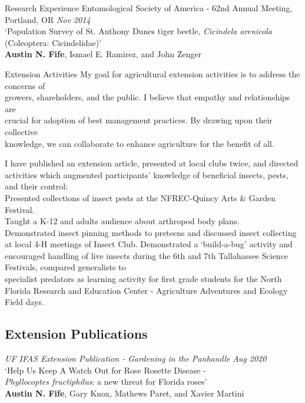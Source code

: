 \documentclass{resume} %
\begin{document}
\begin{rSection}{Research Experience}
Entomological Society of America - 62nd Annual Meeting, Portland, OR \hfill {\em \textit{Nov 2014}}\\
`Population Survey of St. Anthony Dunes tiger beetle, \textit{Cicindela arenicola} (Coleoptera: Cicindelidae)'\\
\textbf{Austin N. Fife}, Ismael E. Ramirez, and John Zenger\\ \hfill

\end{rSection}

\newpage


\begin{rSection}{Extension Activities}
	My goal for agricultural extension activities is to address the concerns of\\
	growers, shareholders, and the public. I believe that empathy and relationships are\\
	crucial	for adoption of best management practices. By drawing upon their collective\\
	knowledge, we can collaborate to enhance agriculture for the benefit of all. 
	
	I have published an extension article, presented at local clubs twice, and directed	activities which augmented participants' knowledge of beneficial insects, pests, and their control:\\
	Presented collections of insect pests at the NFREC-Quincy Arts \& Garden Festival.\\
	Taught a K-12 and adults audience about arthropod body plans.\\
	Demonstrated insect pinning methods	to preteens and discussed insect collecting at local 4-H meetings of Insect Club. Demonstrated a `build-a-bug' activity and encouraged handling of live insects during the 6th and 7th Tallahassee Science Festivals, compared generalists	to\\
	specialist predators as learning activity for first grade students for the North Florida Research and Education Center - Agriculture Adventures and Ecology Field days.
	
	\subsection*{Extension Publications}
	\textit{UF IFAS Extension Publication - Gardening in the Panhandle} \hfill {\em \textit{Aug 2020}}\\
	`Help Us Keep A Watch Out for Rose Rosette Disease -\\ 
	\textit{Phyllocoptes fructiphilus}: a new threat for Florida roses'\\
	\textbf{Austin N. Fife}, Gary Knox, Mathews Paret, and Xavier Martini\\ \hfill


\end{rSection}
\end{document}
